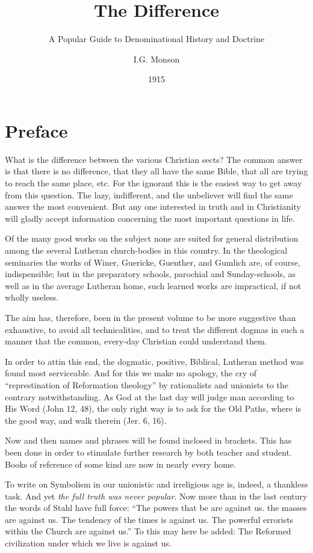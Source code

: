 \documentclass[
]{book}
\title{The Difference}
\subtitle{A Popular Guide to Denominational History and Doctrine}
\author{I.G. Monson}
\date{1915}
\begin{document}
\maketitle

{
\setcounter{tocdepth}{1}
\tableofcontents
}
\hypertarget{preface}{%
\chapter*{Preface}\label{preface}}

What is the difference between the various Christian sects? The common answer is that there is no difference, that they all have the same Bible, that all are trying to reach the same place, etc. For the ignorant this is the easiest way to get away from this question. The lazy, indifferent, and the unbeliever will find the same answer the most convenient. But any one interested in truth and in Christianity will gladly accept information concerning the most important questions in life.

Of the many good works on the subject none are suited for general distribution among the several Lutheran church-bodies in this country. In the theological seminaries the works of Winer, Guericke, Guenther, and Gumlich are, of course, indispensible; but in the preparatory schools, parochial and Sunday-schools, as well as in the average Lutheran home, such learned works are impractical, if not wholly useless.

The aim has, therefore, been in the present volume to be more suggestive than exhaustive, to avoid all technicalities, and to treat the different dogmas in such a manner that the common, every-day Christian could understand them.

In order to attin this end, the dogmatic, positive, Biblical, Lutheran method was found most serviceable. And for this we make no apology, the cry of ``represtination of Reformation theology'' by rationalists and unionists to the contrary notwithstanding. As God at the last day will judge man according to His Word (John 12, 48), the only right way is to ask for the Old Paths, where is the good way, and walk therein (Jer. 6, 16).

Now and then names and phrases will be found inclosed in brackets. This has been done in order to stimulate further research by both teacher and student. Books of reference of some kind are now in nearly every home.

To write on Symbolism in our unionistic and irreligious age is, indeed, a thankless task. And yet \emph{the full truth was never popular}. Now more than in the last century the words of Stahl have full force: ``The powers that be are against us. the masses are against us. The tendency of the times is against us. The powerful errorists within the Church are against us.'' To this may here be added: The Reformed civilization under which we live is against us.
\end{document}
